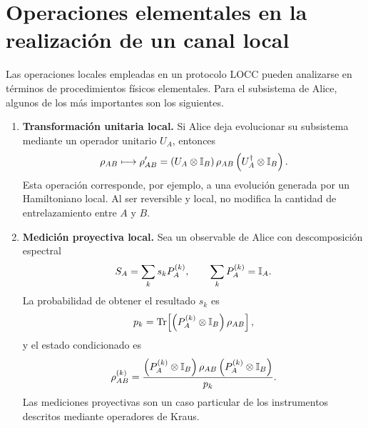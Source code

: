 \documentclass[../main.tex]{subfiles}
\begin{document}
\section{Operaciones elementales en la realización de un canal local}

Las operaciones locales empleadas en un protocolo LOCC pueden analizarse en términos de procedimientos físicos elementales. Para el subsistema de Alice, algunos de los más importantes son los siguientes.

\begin{enumerate}
    \item \textbf{Transformación unitaria local.} Si Alice deja evolucionar su subsistema mediante un operador unitario $U_A$, entonces
    \begin{equation*}
        \rho_{AB}
        \longmapsto
        \rho'_{AB}
        =\left(U_A\otimes\mathbb{I}_B\right)
        \rho_{AB}
        \left(U_A^{\dagger}\otimes\mathbb{I}_B\right).
    \end{equation*}
    Esta operación corresponde, por ejemplo, a una evolución generada por un Hamiltoniano local. Al ser reversible y local, no modifica la cantidad de entrelazamiento entre $A$ y $B$.

    \item \textbf{Medición proyectiva local.} Sea un observable de Alice con descomposición espectral
    \begin{equation*}
        S_A=\sum_k s_k P_A^{(k)},
        \qquad
        \sum_k P_A^{(k)}=\mathbb{I}_A.
    \end{equation*}
    La probabilidad de obtener el resultado $s_k$ es
    \begin{equation*}
        p_k
        =\Tr\!\left[
            \left(P_A^{(k)}\otimes\mathbb{I}_B\right)
            \rho_{AB}
        \right],
    \end{equation*}
    y el estado condicionado es
    \begin{equation*}
        \rho_{AB}^{(k)}
        =\frac{
            \left(P_A^{(k)}\otimes\mathbb{I}_B\right)
            \rho_{AB}
            \left(P_A^{(k)}\otimes\mathbb{I}_B\right)
        }{p_k}.
    \end{equation*}
    Las mediciones proyectivas son un caso particular de los instrumentos descritos mediante operadores de Kraus.


\end{enumerate}
\end{document}
